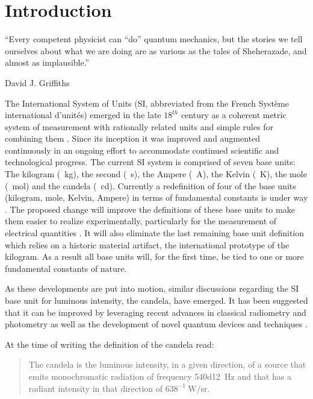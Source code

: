 

\chapter{Introduction}	\label{ch::introduction}

		\epigraph{``Every competent physicist can \enquote{do} quantum mechanics, but the stories we tell ourselves about what we are doing are as various as the tales of Sheherazade, and almost as implausible.''}{\textup{David J. Griffiths}}

		The International System of Units (SI, abbreviated from the French Syst\`eme international d'unit\'es) emerged in the late $18^{th}$ century as a coherent metric system of measurement with rationally related units and simple rules for combining them \cite{zwinckels::1}. Since its inception it was improved and augmented continuously in an ongoing effort to accommodate continued scientific and technological progress. The current SI system is comprised of seven base units: The kilogram (\SI{}{\kg}), the second (\SI{}{\s}), the Ampere (\SI{}{\ampere}), the Kelvin (\SI{}{\kelvin}), the mole (\SI{}{\mole}) and the candela (\SI{}{\candela}). Currently a redefinition of four of the base units (kilogram, mole, Kelvin, Ampere) in terms of fundamental constants is under way \cite{zwinckels::3, Milton, Martin (14 November 2016). Highlights in the work of the BIPM in 2016}. The proposed change will improve the definitions of these base units to make them easier to realize experimentally, particularly for the measurement of electrical quantities \cite{zwinckels::paper}. It will also eliminate the last remaining base unit definition which relies on a historic material artifact, the international prototype of the kilogram. As a result all base units will, for the first time, be tied to one or more fundamental constants of nature.

		As these developments are put into motion, similar discussions regarding the SI base unit for luminous intensity, the candela, have emerged. It has been suggested that it can be improved by leveraging recent advances in classical radiometry and photometry as well as the development of novel quantum devices and techniques \cite{Cheung2007}.

		At the time of writing the definition of the candela read:

		\begin{quote}
			The candela is the luminous intensity, in a given direction, of a source that emits monochromatic radiation of frequency \SI{540d12}{\hertz} and that has a radiant intensity in that direction of $638^{-1} \SI{}{\watt\per\steradian}$.
		\end{quote}

